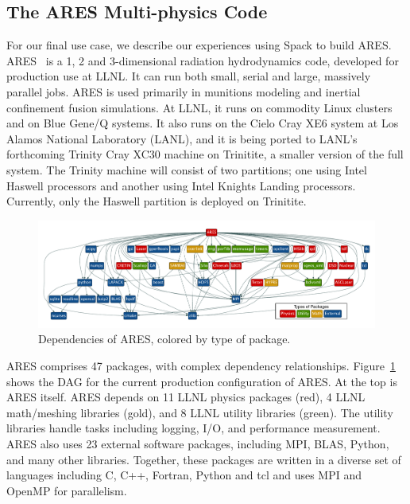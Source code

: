 
\subsection{The ARES Multi-physics Code}
\label{sec:ares}

For our final use case, we describe our experiences using Spack to build ARES.
ARES~\cite{ares1,ares2} is a 1, 2 and 3-dimensional radiation hydrodynamics code,
developed for production use at LLNL.  It can run both small, serial
and large, massively parallel jobs. ARES is used primarily in munitions modeling
and inertial confinement fusion simulations.
%
At LLNL, it runs on commodity Linux clusters and on Blue Gene/Q systems.
It also runs on the Cielo Cray XE6 system at Los Alamos National Laboratory (LANL), and
it is being ported to LANL's forthcoming Trinity Cray XC30 machine on Trinitite,
a smaller version of the full system.  The Trinity machine will consist of two partitions;
one using Intel Haswell processors and another using Intel Knights Landing processors.
Currently, only the Haswell partition is deployed on Trinitite.

\begin{figure}[t]
	\includegraphics[width=\textwidth]{figs/ares-dot/ares-fig.pdf}
	\caption{
		Dependencies of ARES, colored by type of package.
		\label{fig:ares}
	}
\end{figure}

ARES comprises 47 packages, with complex dependency relationships. 
Figure~\ref{fig:ares} shows the DAG for the current production configuration 
of ARES. At the top is ARES itself.  ARES depends on 11 LLNL physics packages 
(red), 4 LLNL math/meshing libraries (gold), and 8 LLNL utility libraries 
(green). The utility libraries handle tasks including logging, I/O, and 
performance measurement. ARES also uses 23 external software packages, 
including MPI, BLAS, Python, and many other libraries.  Together, these 
packages are written in a diverse set of languages including C, C++, 
Fortran, Python and tcl and uses MPI and OpenMP for parallelism.

